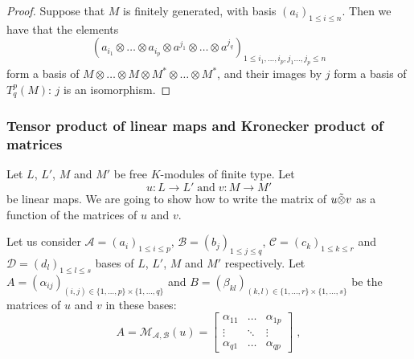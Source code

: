 \documentclass{report}
\theoremstyle{definition}
\theoremstyle{remark}
\begin{document}
\begin{proof}
    

 Suppose that $M$ is finitely generated, with basis $(a_i)_{1 \leq i \leq n}$. Then we have that the elements
    \begin{equation*}
        (a_{i_1} \otimes \dots \otimes a_{i_p} \otimes a^{j_1} \otimes \dots \otimes a^{j_q})_{1 \leq i_1 , \dots, i_p , j_1  \dots, j_p \leq n } 
    \end{equation*} form a basis of $M\otimes \dots \otimes M \otimes M^* \otimes \dots \otimes M^*$, and their images by $j$ form a basis of $T^p_q(M)$: $j$ is an isomorphism.
   
\end{proof}

\vspace{1,5cm}
\subsubsection{Tensor product of linear maps and Kronecker product of matrices}
\bigskip
    Let $L$, $L'$, $M$ and $M'$ be free $K$-modules of finite type. Let $$ u : L \to L'  \; \textrm{and} \; v: M \to M' $$ be linear maps. We are going to show how to write the matrix of $u \Tilde{\otimes} v$ as a function of the matrices of $u$ and $v$.

  
\bigskip
    Let us consider $\mathcal{A}=(a_i)_{1 \leq i \leq p}$, $\mathcal{B}=(b_j)_{1 \leq j \leq q}$, $\mathcal{C}=(c_k)_{1 \leq k \leq r}$ and $\mathcal{D}=(d_l)_{1 \leq l \leq s}$ bases of $L$, $L'$, $M$ and $M'$ respectively. Let $A = (\alpha_{ij})_{(i,j) \in \{1,\dots,p\}\times \{1,\dots,q\}}$ and $B = (\beta_{kl})_{(k,l) \in \{1,\dots,r\}\times\{1,\dots,s\}}$ be the matrices of $u$ and $v$ in these bases: 
    \begin{equation*}
        A=\mathcal{M}_{\mathcal{A}, \mathcal{B}}(u) = \begin{bmatrix}
        \alpha_{11} & \dots &   \alpha_{1p} \\
        \vdots & \ddots & \vdots \\
        \alpha_{q1} & \dots & \alpha_{qp}
        \end{bmatrix}\;,
    \end{equation*}
    
\end{document}
